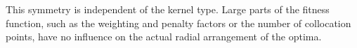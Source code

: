 \documentclass[./\jobname.tex]{subfiles}
\begin{document}
\begin{figure}[H]
	\centering
	\noindent{}
	\label{fig:optima_distribution}
\end{figure}

This symmetry is independent of the kernel type. Large parts of the fitness function, such as the weighting and penalty factors or the number of collocation points, have no influence on the actual radial arrangement of the optima. 
\end{document}
